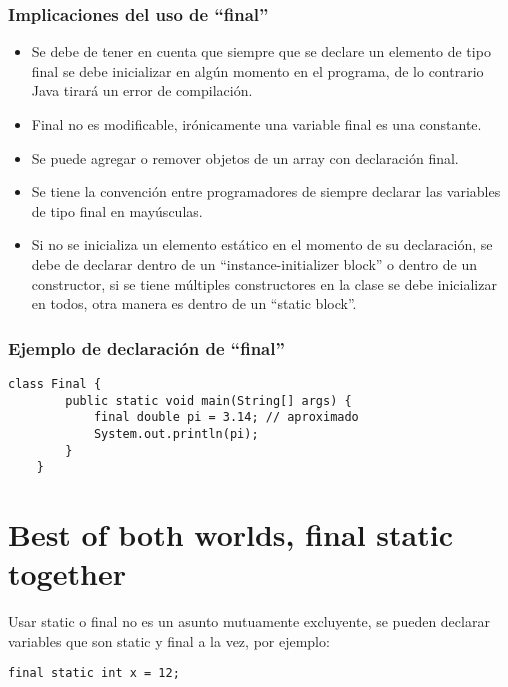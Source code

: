 \documentclass{article}
\begin{document}
\subsubsection{Implicaciones del uso de ``final''}
\begin{itemize}
    \item Se debe de tener en cuenta que siempre que se declare un elemento de tipo final se debe inicializar en algún momento en el programa, de lo contrario Java tirará un error de compilación.
    \item Final no es modificable, irónicamente una variable final es una constante.
    \item Se puede agregar o remover objetos de un array con declaración final.
    \item Se tiene la convención entre programadores de siempre declarar las variables de tipo final en mayúsculas.
    \item Si no se inicializa un elemento estático en el momento de su declaración, se debe de declarar dentro de un ``instance-initializer block'' o dentro de un constructor, si se tiene múltiples constructores en la clase se debe inicializar en todos, otra manera es dentro de un ``static block''.
\end{itemize}

\subsubsection{Ejemplo de declaración de ``final''}
\begin{Verbatim}[breaklines=true, breakanywhere=true]
    class Final {
        public static void main(String[] args) {
            final double pi = 3.14; // aproximado
            System.out.println(pi);
        }
    }
\end{Verbatim}


\section{Best of both worlds, final static together}
Usar static o final no es un asunto mutuamente excluyente, se pueden declarar variables que son static y final a la vez, por ejemplo: 
\begin{Verbatim}[breaklines=true, breakanywhere=true]
    final static int x = 12;
\end{Verbatim}
\end{document}
